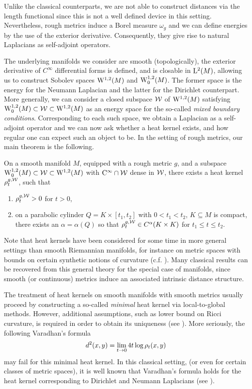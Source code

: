 \documentclass[a4paper, 12pt]{amsart}
\begin{document}
Unlike the classical counterparts, we are not able
to construct distances via the length functional since 
this is not a well defined device in this setting.
Nevertheless, rough metrics induce a Borel measure $\omega_g$ and we can define energies by the use 
of the exterior derivative. Consequently,  they give rise to natural Laplacians as self-adjoint operators.

The underlying manifolds we consider are smooth (topologically), 
the exterior derivative of \(C^{\infty}\) differential forms is defined, and is closable 
in $\Lp{2}(M)$, allowing us to construct Sobolev spaces $\SobH{1}(M)$
and $\SobH[0]{1}(M)$. The
former space is the  energy for the Neumann Laplacian
and the latter for the Dirichlet counterpart.
More generally, we can consider a closed subspace $\cW$ of $\SobH{1}(M)$
satisfying $\SobH[0]{1}(M) \subset \cW \subset \SobH{1}(M)$
as an energy space for the so-called \emph{mixed boundary conditions}. 
Corresponding to each such space, we obtain a Laplacian
as a self-adjoint operator and we can now ask
whether a heat kernel exists, and how regular one
can expect such an object to be. In the setting of rough metrics, our main theorem
is the following. 

\begin{thm}
\label{Thm:Main}
On a smooth manifold \(M\), equipped with a rough metric \(g\), 
and a subspace $\SobH[0]{1}(M) \subset \cW \subset \SobH{1}(M)$
with $\Ck{\infty} \intersect \cW$ dense in $\cW$, 
there exists a heat kernel \(\hk_t^{g,\cW}\), such that
\begin{enumerate}
\item \(\hk_t^{g,\cW} > 0\) for \(t > 0\),
\item on a parabolic cylinder \(Q = K \times [t_1, t_2]\) with \(0 < t_1 < t_2\), \(K \subseteq M\) is compact, there exists an \(\alpha = \alpha(Q)\) so that \(\hk_t^{g,\cW} \in C^{\alpha}(K \times K)\) for \(t_1 \leq t \leq t_2\).
\end{enumerate}
\end{thm}


Note that heat kernels have been considered
for some time in more general settings than smooth Riemannian manifolds,
for instance on metric spaces with bounds
on certain synthetic notions of curvature (c.f. \cite{Sturmi}).
Many classical results can be recovered from this general 
theory for the special case of manifolds, 
since smooth (or continuous) metrics induce an associated intrinsic
distance structure. 

The treatment of heat kernels on smooth manifolds with smooth metrics 
usually proceed by constructing
a so-called \emph{minimal} heat kernel via local-to-global methods.
However, additional assumptions, such as lower bound on Ricci curvature,
is required in order to obtain its uniqueness  (see \cite{Chavel}).
More seriously, the following Varadhan's formula
$$ d^2(x,y) = \lim_{t \to 0} 4 t \log \hk_t(x,y)$$
may fail for this minimal heat kernel. 
In this classical setting, (or even for certain classes of 
metric spaces), it is well known that Varadhan's formula holds for the heat 
kernel corresponding to Dirichlet and Neumann Laplacians 
(see  \cite{Norris, ERS}).
\end{document}
